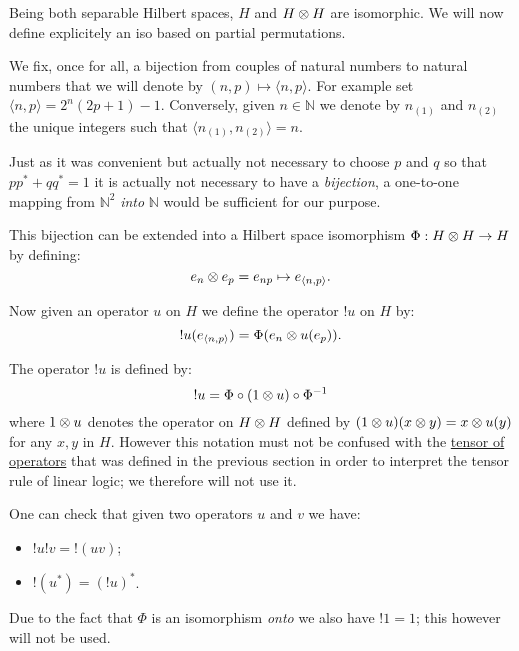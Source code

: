 Being both separable Hilbert spaces, \(H\) and \(H\otimes H\) are
isomorphic. We will now define explicitely an iso based on partial
permutations.

We fix, once for all, a bijection from couples of natural numbers to
natural numbers that we will denote by
\((n,p)\mapsto\langle n,p\rangle\). For example set
\(\langle n,p\rangle = 2^n(2p+1) - 1\). Conversely, given
\(n\in\mathbb{N}\) we denote by \(n_{(1)}\) and \(n_{(2)}\) the unique
integers such that \(\langle n_{(1)},
n_{(2)}\rangle = n\).

\begin{remark}
Just as it was convenient but actually not necessary to choose $p$ and $q$ so that $pp^* + qq^* = 1$ it is actually not necessary to have a \emph{bijection}, a one-to-one mapping from $\mathbb{N}^2$ \emph{into} $\mathbb{N}$ would be sufficient for our purpose.
\end{remark}

This bijection can be extended into a Hilbert space isomorphism
\(\Phi:H\otimes H\rightarrow H\) by defining:
\begin{equation*}
e_n\otimes e_p = e_{np} \mapsto e_{\langle n,p\rangle}.
\end{equation*}

Now given an operator \(u\) on \(H\) we define the operator \(!u\) on
\(H\) by:
\begin{equation*}
!u(e_{\langle n,p\rangle}) = \Phi(e_n\otimes u(e_p)).
\end{equation*}

\begin{remark}
The operator $!u$ is defined by:
\begin{equation*}
!u = \Phi\circ (1\otimes u)\circ \Phi^{-1}
\end{equation*}
where $1\otimes u$ denotes the operator on $H\otimes H$ defined by $(1\otimes u)(x\otimes y) = x\otimes u(y)$ for any $x,y$ in $H$. However this notation must not be confused with the \hyperref[the-tensor-rule]{tensor of operators} that was defined in the previous section in order to interpret the tensor rule of linear logic; we therefore will not use it.
\end{remark}

One can check that given two operators \(u\) and \(v\) we have:
\begin{itemize}
\item \(!u!v = {!(uv)}\);
\item \(!(u^*) = (!u)^*\).
\end{itemize}
Due to the fact that \(\Phi\) is an isomorphism \emph{onto} we also have
\(!1=1\); this however will not be used.

